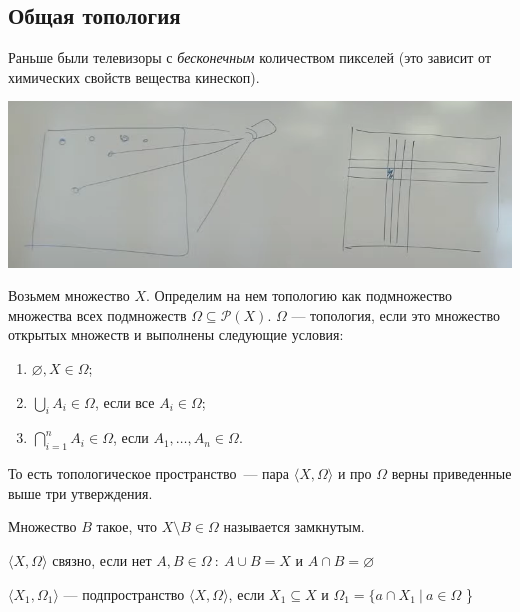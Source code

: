 \subsection{Общая топология}

Раньше были телевизоры с \textit{бесконечным} количеством пикселей (это зависит от химических свойств вещества кинескоп).

\begin{center}
    \includegraphics[scale=0.8]{img/topology_tv_example}
\end{center}

Возьмем множество $X$. Определим на нем топологию как подмножество множества всех подмножеств
$\Omega \subseteq \mathcal{P}(X)$. $\Omega$ --- топология, если это множество открытых множеств и выполнены следующие условия:
\begin{enumerate}
    \item $\varnothing, X \in \Omega$;
    \item $\bigcup\limits_i A_i \in \Omega$, если все $A_i \in \Omega$;
    \item $\bigcap\limits_{i = 1} ^ n A_i \in \Omega$, если $A_1, \dots, A_n \in \Omega$.
\end{enumerate}

То есть топологическое пространство~--- пара $\langle X, \Omega \rangle$ и про $\Omega$ верны приведенные выше три утверждения.

\begin{definition}
 Множество $B$ такое, что $X \setminus B \in \Omega$ называется замкнутым.
\end{definition}

\begin{definition}
     $\langle X, \Omega \rangle$ связно, если нет $A, B \in \Omega ~:~ A \cup B = X$ и $A \cap B = \varnothing$
\end{definition}

\begin{definition}[Подпространство]
    $\langle X_1, \Omega_1 \rangle $ --- подпространство $\langle X, \Omega \rangle$, если
    $X_1 \subseteq X$ и $\Omega_1 = \{ a \cap X_1 ~|~ a \in \Omega$ \}
\end{definition}

